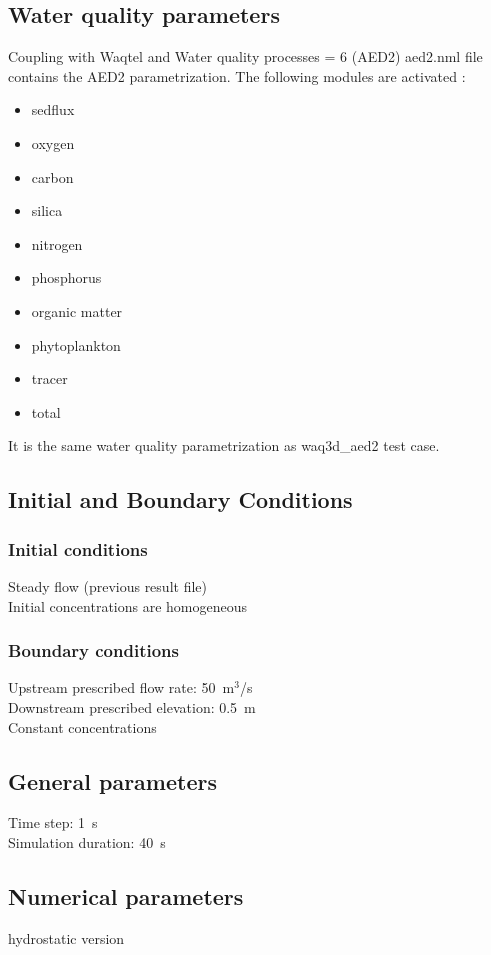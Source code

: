 \subsection{Water quality parameters}
Coupling with Waqtel and Water quality processes = 6 (AED2)
aed2.nml file contains the AED2 parametrization. The following modules are activated :
\begin{itemize}
	\item sedflux
	\item oxygen
	\item carbon
	\item silica
	\item nitrogen
	\item phosphorus 
	\item organic matter
	\item phytoplankton
	\item tracer
	\item total
\end{itemize}
It is the same water quality parametrization as waq3d\_aed2 test case.
%
\subsection{Initial and Boundary Conditions}
%
\subsubsection{Initial conditions}
%
Steady flow (previous result file)\\
Initial concentrations are homogeneous\\
%
\subsubsection{Boundary conditions}
%
Upstream prescribed flow rate: 50~m$^3$/s\\
Downstream prescribed elevation: 0.5~m\\
Constant concentrations\\

%
\subsection{General parameters}
%
Time step: 1~s\\
Simulation duration: 40~s
%

\subsection{Numerical parameters}
%
hydrostatic version\\
%

